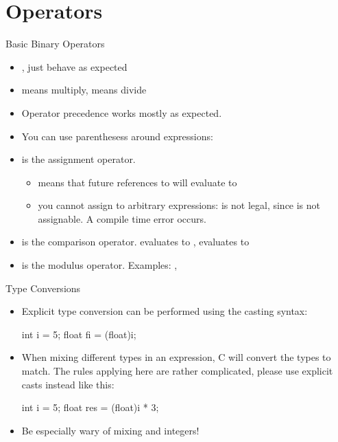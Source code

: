 \documentclass[10pt,graphics,aspectratio=169,table]{beamer}
\begin{document}
\section{Operators}
\begin{frame}[fragile]{Basic Binary Operators}
    \begin{itemize}
        \item \code{+}, \code{-} just behave as expected
        \item \code{*} means multiply, \code{/} means divide
        \item Operator precedence works mostly as expected.
        \item You can use parenthesess around expressions: 
        \item \code{=} is the assignment operator.
        \begin{itemize}
            \item
                 means that future references to 
                will evaluate to 
            \item
                you cannot assign to arbitrary expressions:
                 is not legal, since 
                is not assignable. A compile time error occurs.
        \end{itemize}
        \item \code{==} is the comparison operator.
             evaluates to ,
             evaluates to 
        \item
            \code{\%} is the modulus operator.
            Examples: , 
    \end{itemize}
\end{frame}

\begin{frame}[fragile]{Type Conversions}
    \begin{itemize}
        \item 
            Explicit type conversion can be performed using the casting syntax:
            \begin{codeblock}
int i = 5;
float fi = (float)i;
            \end{codeblock}
        \item 
            When mixing different types in an expression, C will convert the
            types to match. The rules applying here are rather complicated,
            please use explicit casts instead like this: 
            \begin{codeblock}
int i = 5;
float res = (float)i * 3;
            \end{codeblock}
        \item 
            Be especially wary of mixing 
            and  integers!
    \end{itemize}\ \\
    \ \\

\end{frame}
\end{document}
